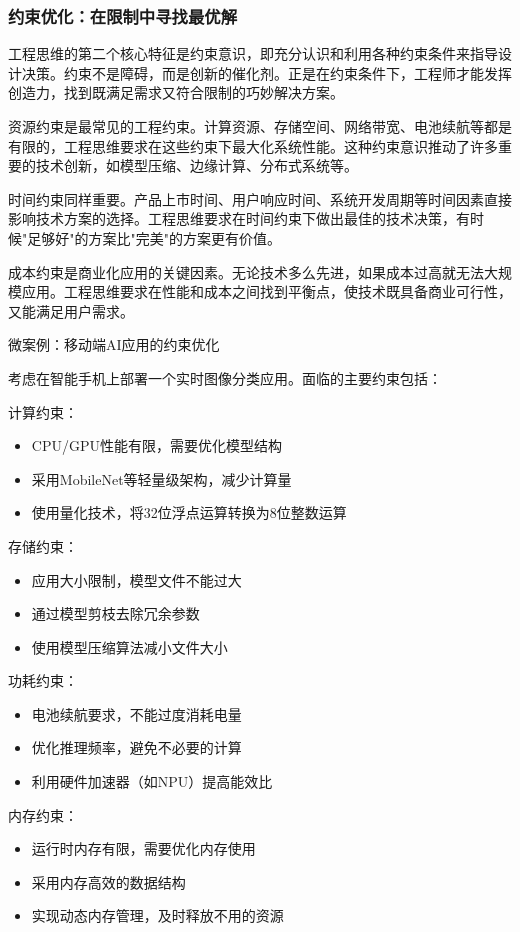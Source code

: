 \subsubsection{约束优化：在限制中寻找最优解}

工程思维的第二个核心特征是约束意识，即充分认识和利用各种约束条件来指导设计决策。约束不是障碍，而是创新的催化剂。正是在约束条件下，工程师才能发挥创造力，找到既满足需求又符合限制的巧妙解决方案。

资源约束是最常见的工程约束。计算资源、存储空间、网络带宽、电池续航等都是有限的，工程思维要求在这些约束下最大化系统性能。这种约束意识推动了许多重要的技术创新，如模型压缩、边缘计算、分布式系统等。

时间约束同样重要。产品上市时间、用户响应时间、系统开发周期等时间因素直接影响技术方案的选择。工程思维要求在时间约束下做出最佳的技术决策，有时候"足够好"的方案比"完美"的方案更有价值。

成本约束是商业化应用的关键因素。无论技术多么先进，如果成本过高就无法大规模应用。工程思维要求在性能和成本之间找到平衡点，使技术既具备商业可行性，又能满足用户需求。

微案例：移动端AI应用的约束优化

考虑在智能手机上部署一个实时图像分类应用。面临的主要约束包括：

计算约束：
\begin{itemize}
\item CPU/GPU性能有限，需要优化模型结构
\item 采用MobileNet等轻量级架构，减少计算量
\item 使用量化技术，将32位浮点运算转换为8位整数运算
\end{itemize}

存储约束：
\begin{itemize}
\item 应用大小限制，模型文件不能过大
\item 通过模型剪枝去除冗余参数
\item 使用模型压缩算法减小文件大小
\end{itemize}

功耗约束：
\begin{itemize}
\item 电池续航要求，不能过度消耗电量
\item 优化推理频率，避免不必要的计算
\item 利用硬件加速器（如NPU）提高能效比
\end{itemize}

内存约束：
\begin{itemize}
\item 运行时内存有限，需要优化内存使用
\item 采用内存高效的数据结构
\item 实现动态内存管理，及时释放不用的资源
\end{itemize}

